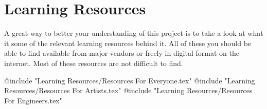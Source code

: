 \chapter{Learning Resources}

A great way to better your understanding of this project is to take a look at what it some of the relevant learning resources behind it. All of these you should be able to find available from major vendors or freely in digital format on the internet. Most of these resources are not difficult to find.

@include "Learning Resources/Resources For Everyone.tex"
@include "Learning Resources/Resources For Artists.tex"
@include "Learning Resources/Resources For Engineers.tex"


